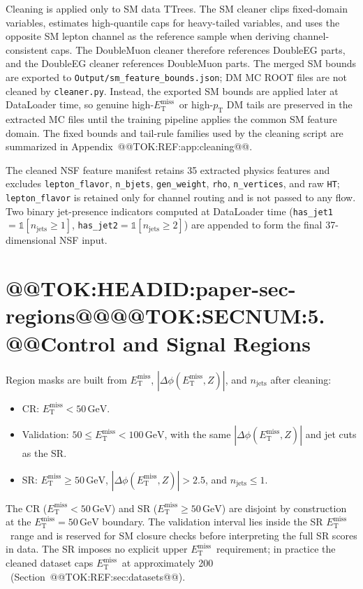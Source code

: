 \documentclass[11pt]{article}
\newcommand{\GeV}{\text{GeV}}
\newcommand{\MET}{\ensuremath{E_{\mathrm{T}}^{\mathrm{miss}}}}
\begin{document}
Cleaning is applied only to SM data TTrees. The SM cleaner clips fixed-domain variables,
estimates high-quantile caps for heavy-tailed variables, and uses the opposite SM lepton
channel as the reference sample when deriving channel-consistent caps. The DoubleMuon
cleaner therefore references DoubleEG parts, and the DoubleEG cleaner references
DoubleMuon parts. The merged SM bounds are exported to
\texttt{Output/sm\_feature\_bounds.json}; DM MC ROOT files are not cleaned by
\texttt{cleaner.py}. Instead, the exported SM bounds are applied later at DataLoader time,
so genuine high-\MET\ or high-$p_{\mathrm{T}}$ DM tails are preserved in the extracted MC
files until the training pipeline applies the common SM feature domain. The fixed bounds
and tail-rule families used by the cleaning script are summarized in
Appendix~@@TOK:REF:app:cleaning@@.

The cleaned NSF feature manifest retains 35 extracted physics features and excludes
\texttt{lepton\_flavor}, \texttt{n\_bjets}, \texttt{gen\_weight}, \texttt{rho},
\texttt{n\_vertices}, and raw \texttt{HT}; \texttt{lepton\_flavor} is retained only for
channel routing and is not passed to any flow.
Two binary jet-presence indicators computed at DataLoader time
(\texttt{has\_jet1}$=\mathbb{1}[n_\mathrm{jets}\ge 1]$,
\texttt{has\_jet2}$=\mathbb{1}[n_\mathrm{jets}\ge 2]$) are appended to form the final
37-dimensional NSF input.

\section{@@TOK:HEADID:paper-sec-regions@@@@TOK:SECNUM:5. @@Control and Signal Regions}

Region masks are built from \MET, $|\Delta\phi(\MET,Z)|$, and $n_{\mathrm{jets}}$ after
cleaning:
\begin{itemize}
  \item CR: $\MET < 50\,\GeV$.
  \item Validation: $50 \le \MET < 100\,\GeV$, with the same
        $|\Delta\phi(\MET,Z)|$ and jet cuts as the SR.
  \item SR: $\MET \ge 50\,\GeV$, $|\Delta\phi(\MET,Z)| > 2.5$, and
        $n_{\mathrm{jets}}\le 1$.
\end{itemize}
The CR ($\MET<50\,\GeV$) and SR ($\MET\ge 50\,\GeV$) are disjoint by construction at the
$\MET=50\,\GeV$ boundary.
The validation interval lies inside the SR \MET\ range and is reserved for SM closure
checks before interpreting the full SR scores in data.
The SR imposes no explicit upper \MET\ requirement; in practice the
cleaned dataset caps \MET\ at approximately 200\,\GeV\
(Section~@@TOK:REF:sec:datasets@@).
\end{document}
